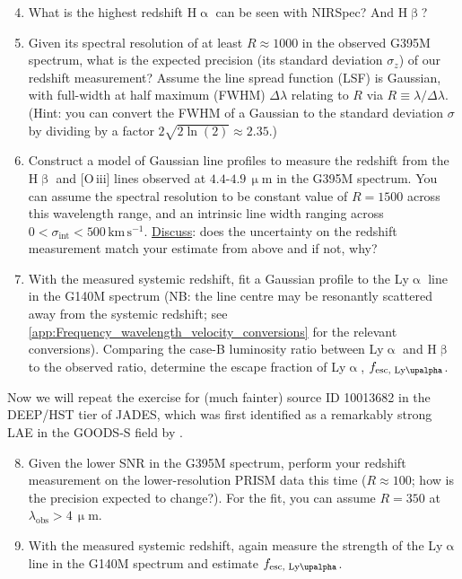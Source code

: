 \documentclass{article}
\newcommand{\Lya}{{Ly\ensuremath{\upalpha}}\xspace}
\newcommand{\OIII}{\hbox{[O\,{\sc iii}]}\xspace}
\newcommand{\Halpha}{\ensuremath{\mathrm{H}\upalpha}\xspace}
\newcommand{\Hbeta}{\ensuremath{\mathrm{H}\upbeta}\xspace}
\theoremstyle{definition}
\begin{document}
\begin{enumerate}[label=(\alph*)]
    \setcounter{enumi}{3}
    \item What is the highest redshift \Halpha can be seen with NIRSpec? And \Hbeta?
    \item Given its spectral resolution of at least $R \approx 1000$ in the observed G395M spectrum, what is the expected precision (its standard deviation $\sigma_z$) of our redshift measurement? Assume the line spread function (LSF) is Gaussian, with full-width at half maximum (FWHM) $\Delta \lambda$ relating to $R$ via $R \equiv \lambda/\Delta\lambda$. (Hint: you can convert the FWHM of a Gaussian to the standard deviation $\sigma$ by dividing by a factor $2 \sqrt{2 \ln(2)} \approx 2.35$.)
    \item Construct a model of Gaussian line profiles to measure the redshift from the \Hbeta and \OIII lines observed at $4.4$-$4.9 \, \mathrm{\upmu m}$ in the G395M spectrum. You can assume the spectral resolution to be constant value of $R = 1500$ across this wavelength range, and an intrinsic line width ranging across $0 < \sigma_\text{int} < 500 \, \mathrm{km \, s^{-1}}$. \underline{Discuss}: does the uncertainty on the redshift measurement match your estimate from above and if not, why?
    \item With the measured systemic redshift, fit a Gaussian profile to the \Lya line in the G140M spectrum (NB: the line centre may be resonantly scattered away from the systemic redshift; see \cref{app:Frequency_wavelength_velocity_conversions} for the relevant conversions). Comparing the case-B luminosity ratio between \Lya and \Hbeta \citep[$L_\text{\Lya}/L_\text{\Hbeta} \approx 23.3$;][]{2023A&A...678A..68S} to the observed ratio, determine the escape fraction of \Lya, $f_\text{esc, \Lya}$.
\end{enumerate}

\noindent Now we will repeat the exercise for (much fainter) source ID 10013682 in the DEEP/HST tier of JADES, which was first identified as a remarkably strong LAE in the GOODS-S field by \citet{2023A&A...678A..68S}.

\begin{enumerate}[label=(\alph*)]
    \setcounter{enumi}{7}
    \item Given the lower SNR in the G395M spectrum, perform your redshift measurement on the lower-resolution PRISM data this time ($R \approx 100$; how is the precision expected to change?). For the fit, you can assume $R = 350$ at $\lambda_\mathrm{obs} > 4 \, \mathrm{\upmu m}$.
    \item With the measured systemic redshift, again measure the strength of the \Lya line in the G140M spectrum and estimate $f_\text{esc, \Lya}$.
\end{enumerate}
\end{document}
